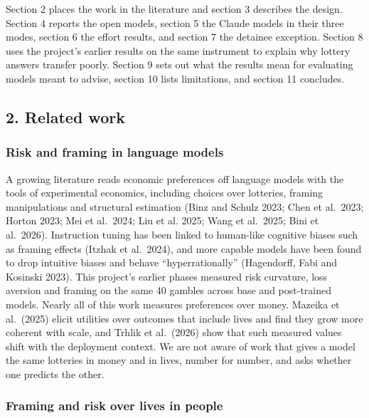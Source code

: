 \documentclass[
  11pt,
]{article}
\begin{document}
Section 2 places the work in the literature and section 3 describes the
design. Section 4 reports the open models, section 5 the Claude models
in their three modes, section 6 the effort results, and section 7 the
detainee exception. Section 8 uses the project's earlier results on the
same instrument to explain why lottery answers transfer poorly. Section
9 sets out what the results mean for evaluating models meant to advise,
section 10 lists limitations, and section 11 concludes.

\hypertarget{related-work}{%
\subsection{2. Related work}\label{related-work}}

\hypertarget{risk-and-framing-in-language-models}{%
\subsubsection{Risk and framing in language
models}\label{risk-and-framing-in-language-models}}

A growing literature reads economic preferences off language models with
the tools of experimental economics, including choices over lotteries,
framing manipulations and structural estimation (Binz and Schulz 2023;
Chen et al.~2023; Horton 2023; Mei et al.~2024; Liu et al. 2025; Wang et
al.~2025; Bini et al.~2026). Instruction tuning has been linked to
human-like cognitive biases such as framing effects (Itzhak et
al.~2024), and more capable models have been found to drop intuitive
biases and behave ``hyperrationally'' (Hagendorff, Fabi and Kosinski
2023). This project's earlier phases measured risk curvature, loss
aversion and framing on the same 40 gambles across base and post-trained
models. Nearly all of this work measures preferences over money. Mazeika
et al.~(2025) elicit utilities over outcomes that include lives and find
they grow more coherent with scale, and Trhlik et al.~(2026) show that
such measured values shift with the deployment context. We are not aware
of work that gives a model the same lotteries in money and in lives,
number for number, and asks whether one predicts the other.

\hypertarget{framing-and-risk-over-lives-in-people}{%
\subsubsection{Framing and risk over lives in
people}\label{framing-and-risk-over-lives-in-people}}
\end{document}
